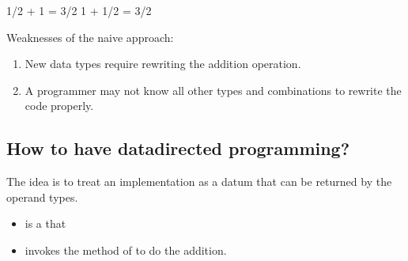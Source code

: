 \documentclass[letterpaper,10pt,english]{sphinxmanual}
\begin{document}
\begin{sphinxVerbatim}[commandchars=\\\{\}]
     
         
\end{sphinxVerbatim}

\begin{sphinxVerbatim}[commandchars=\\\{\}]
1/2 + 1 = 3/2
1 + 1/2 = 3/2
\end{sphinxVerbatim}

Weaknesses of the naive approach:
\begin{enumerate}
%
\item {} 
New data types require rewriting the addition operation.

\item {} 
A programmer may not know all other types and combinations to rewrite the code properly.

\end{enumerate}


\subsection{How to have data\sphinxhyphen{}directed programming?}
\label{\detokenize{Lecture5/Objects:how-to-have-data-directed-programming}}
The idea is to treat an implementation as a datum that can be returned by the operand types.
\begin{itemize}
\item {} 
 is a  that

\item {} 
invokes the method  of  to do the addition.

\end{itemize}
\end{document}
